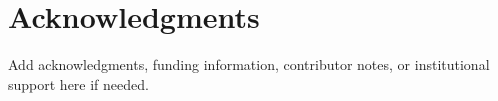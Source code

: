 \clearpage
\section*{Acknowledgments}
{}

Add acknowledgments, funding information, contributor notes, or institutional support here if needed.
